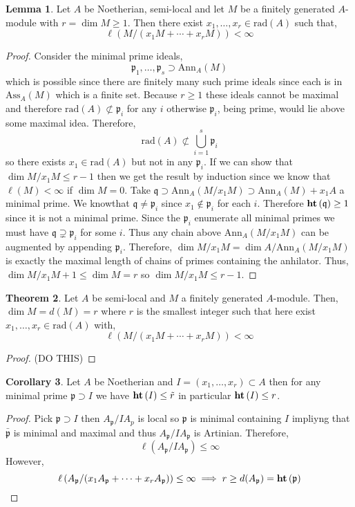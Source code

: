 \documentclass[12pt]{article}
\newcommand{\Ann}[2]{\mathrm{Ann}_{#1}\left(#2\right)}
\newcommand{\Ass}[2]{\mathrm{Ass}_{#1}\left( #2 \right)}
\newcommand{\rad}[1]{\mathrm{rad}\left( #1 \right)}
\newcommand{\p}{\mathfrak{p}}
\newcommand{\q}{\mathfrak{q}}
\theoremstyle{remark}
\theoremstyle{definition}
\newtheorem{theorem}{Theorem}[section]
\newtheorem{lemma}[theorem]{Lemma}
\newtheorem{corollary}[theorem]{Corollary}
\begin{document}
\begin{lemma}
Let $A$ be Noetherian, semi-local and let $M$ be a finitely generated $A$-module with $r = \dim{M} \ge 1$. Then there exist $x_1, \dots, x_r \in \rad{A}$ such that,
\[ \ell(M / (x_1 M + \cdots + x_r M )) < \infty \] 
\end{lemma}

\begin{proof}
Consider the minimal prime ideals,
\[ \p_1, \dots, \p_s \supset \Ann{A}{M} \]
which is possible since there are finitely many such prime ideals since each is in $\Ass{A}{M}$ which is a finite set. Because $r \ge 1$ these ideals cannot be maximal and therefore $\rad{A} \not\subset \p_i$ for any $i$ otherwise $\p_i$, being prime, would lie above some maximal idea. Therefore,
\[ \rad{A} \not\subset \bigcup_{i = 1}^s \p_i \]
so there exists $x_1 \in \rad{A}$ but not in any $\p_i$. If we can show that $\dim{M / x_1 M} \le r - 1$ then we get the result by induction since we know that $\ell(M) < \infty$ if $\dim{M} = 0$. Take $\q \supset \Ann{A}{M/x_1 M} \supset \Ann{A}{M} + x_1 A$  a minimal prime. We knowthat $\q \neq \p_i$ since $x_1 \notin \p_i$ for each $i$. Therefore $\height{\q} \ge 1$ since it is not a minimal prime. Since the $\p_i$ enumerate all minimal primes we must have $\q \supsetneq \p_i$ for some $i$. Thus any chain above $\Ann{A}{M/x_1 M}$ can be augmented by appending $\p_i$. Therefore, $\dim{M / x_1 M} = \dim{A / \Ann{A}{M / x_1 M}}$ is exactly the maximal length of chains of primes containing the anhilator. Thus, $\dim{M / x_1 M} + 1 \le \dim{M} = r$ so $\dim{M / x_1 M} \le r - 1$. 
\end{proof}

\begin{theorem}
Let $A$ be semi-local and $M$ a finitely generated $A$-module. Then, $\dim{M} = d(M) = r$ where $r$ is the smallest integer such that here exist $x_1, \dots, x_r \in \rad{A}$ with,
\[ \ell(M / (x_1 M + \cdots + x_r M )) < \infty \] 
\end{theorem}

\begin{proof}
(DO THIS)
\end{proof}

\begin{corollary}
Let $A$ be Noetherian and $I = (x_1, \dots, x_r) \subset A$ then for any minimal prime $\p \supset I$ we have $\mathbf{ht}\left( I \right) \le \tilde{r}$ in particular $\mathbf{ht}\left( I \right) \le r$. 
\end{corollary}

\begin{proof}
Pick $\p \supset I$ then $A_\p / I A_p$ is local so $\p$ is minimal containing $I$ impliyng that $\bar{\p}$ is minimal and maximal and thus $A_{\p} / I A_{\p}$ is Artinian. Therefore, 
\[ \ell\left( A_{\p} / I A_{\p} \right) \le \infty \]
However,
\[ \ell \left(A_{\p} / (x_1 A_{\p} + \cdots + x_r A_{\p}) \right) \le \infty \implies r \ge d(A_{\p}) = \height{\p} \]
\end{proof}
\end{document}
